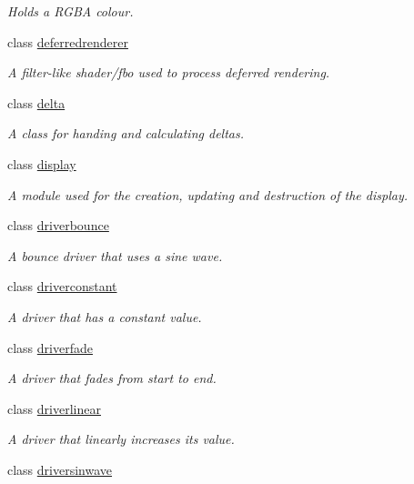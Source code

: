 \begin{DoxyCompactItemize}
\begin{DoxyCompactList}\small\item\em Holds a R\+G\+BA colour. \end{DoxyCompactList}\item 
class \hyperlink{classflounder_1_1deferredrenderer}{deferredrenderer}
\begin{DoxyCompactList}\small\item\em A filter-\/like shader/fbo used to process deferred rendering. \end{DoxyCompactList}\item 
class \hyperlink{classflounder_1_1delta}{delta}
\begin{DoxyCompactList}\small\item\em A class for handing and calculating deltas. \end{DoxyCompactList}\item 
class \hyperlink{classflounder_1_1display}{display}
\begin{DoxyCompactList}\small\item\em A module used for the creation, updating and destruction of the display. \end{DoxyCompactList}\item 
class \hyperlink{classflounder_1_1driverbounce}{driverbounce}
\begin{DoxyCompactList}\small\item\em A bounce driver that uses a sine wave. \end{DoxyCompactList}\item 
class \hyperlink{classflounder_1_1driverconstant}{driverconstant}
\begin{DoxyCompactList}\small\item\em A driver that has a constant value. \end{DoxyCompactList}\item 
class \hyperlink{classflounder_1_1driverfade}{driverfade}
\begin{DoxyCompactList}\small\item\em A driver that fades from start to end. \end{DoxyCompactList}\item 
class \hyperlink{classflounder_1_1driverlinear}{driverlinear}
\begin{DoxyCompactList}\small\item\em A driver that linearly increases its value. \end{DoxyCompactList}\item 
class \hyperlink{classflounder_1_1driversinwave}{driversinwave}

\end{DoxyCompactItemize}

